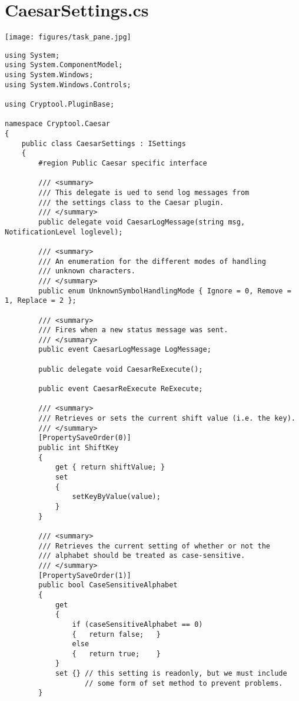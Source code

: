 \chapter{CaesarSettings.cs}
\label{app:CaesarSettings}

\begin{center}
		\texttt{[image: figures/task\_pane.jpg]}
\end{center}

\begin{lstlisting}
using System;
using System.ComponentModel;
using System.Windows;
using System.Windows.Controls;

using Cryptool.PluginBase;

namespace Cryptool.Caesar
{
    public class CaesarSettings : ISettings
    {
        #region Public Caesar specific interface

        /// <summary>
        /// This delegate is ued to send log messages from
        /// the settings class to the Caesar plugin.
        /// </summary>
        public delegate void CaesarLogMessage(string msg, NotificationLevel loglevel);

        /// <summary>
        /// An enumeration for the different modes of handling
        /// unknown characters.
        /// </summary>
        public enum UnknownSymbolHandlingMode { Ignore = 0, Remove = 1, Replace = 2 };

        /// <summary>
        /// Fires when a new status message was sent.
        /// </summary>
        public event CaesarLogMessage LogMessage;

        public delegate void CaesarReExecute();

        public event CaesarReExecute ReExecute;

        /// <summary>
        /// Retrieves or sets the current shift value (i.e. the key).
        /// </summary>
        [PropertySaveOrder(0)]
        public int ShiftKey
        {
            get { return shiftValue; }
            set
            {
                setKeyByValue(value);
            }
        }

        /// <summary>
        /// Retrieves the current setting of whether or not the
        /// alphabet should be treated as case-sensitive.
        /// </summary>
        [PropertySaveOrder(1)]
        public bool CaseSensitiveAlphabet
        {
            get
            {
                if (caseSensitiveAlphabet == 0)
                {   return false;   }
                else
                {   return true;    }
            }
            set {} // this setting is readonly, but we must include
                   // some form of set method to prevent problems.
        }


\end{lstlisting}
